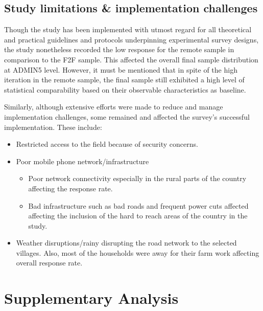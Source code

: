 \documentclass[11pt,harvard]{article}
\begin{document}
	
	
	
	\pagebreak
	
	
	\subsection{Study limitations \& implementation challenges}
	
	Though the study has been implemented with utmost regard for all theoretical and practical guidelines and protocols underpinning experimental survey designs, the study nonetheless recorded the low response for the remote sample in comparison to the F2F sample. This affected the overall final sample distribution at ADMIN5 level. However, it must be mentioned that in spite of the high iteration in the remote sample, the final sample still exhibited a high level of statistical comparability based on their observable characteristics as baseline.
	
	
	Similarly, although extensive efforts were made to reduce and manage implementation challenges, some remained and affected the survey's successful implementation. These include:
	
	\begin{itemize}[label=--, left=2.5em]
		\item[1.] Restricted access to the field because of security concerns.
		\item[2.] Poor mobile phone network/infrastructure 
		\begin{itemize}[label=--, left=1.75em]
			\item[a.]	Poor network connectivity especially in the rural parts of the country affecting the response rate.
			\item[b.]	Bad infrastructure such as bad roads and frequent power cuts affected affecting the inclusion of the hard to reach areas of the country in the study.
		\end{itemize}
		\item[3.] Weather disruptions/rainy disrupting the road network to the selected villages. Also, most of the households were away for their farm work affecting overall response rate.
	\end{itemize}
	
	\section{Supplementary Analysis}
	
\end{document}
